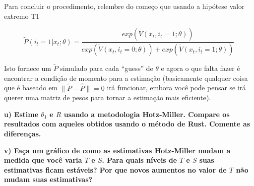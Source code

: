 \documentclass[12pt,a4paper]{article}
\begin{document}
Para concluir o procedimento, relembre do começo que usando a hipótese
valor extremo T1

\[
\tilde{P}(i_t=1|x_t;\theta)=\frac{exp(\tilde{V}(x_t,i_t=1;\theta))}{exp(\tilde{V}(x_t,i_t=0;\theta))+exp(\tilde{V}(x_t,i_t=1;\theta))}
\]

Isto fornece um \(\tilde{P}\) simulado para cada ``guess'' de \(\theta\)
e agora o que falta fazer é encontrar a condição de momento para a
estimação (basicamente qualquer coisa que é baseado em
\(\| \tilde{P} - \hat{P} \| = 0\) irá funcionar, embora você pode pensar
se irá querer uma matriz de pesos para tornar a estimação mais
eficiente).

\textbf{u) Estime \(\theta_1\) e \(R\) usando a metodologia Hotz-Miller.
Compare os resultados com aqueles obtidos usando o método de Rust.
Comente as diferenças.}

\textbf{v) Faça um gráfico de como as estimativas Hotz-Miller mudam a
medida que você varia \(T\) e \(S\). Para quais níveis de \(T\) e \(S\)
suas estimativas ficam estáveis? Por que novos aumentos no valor de
\(T\) não mudam suas estimativas?}
\end{document}

